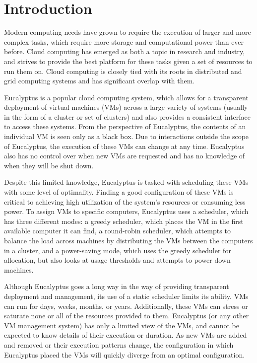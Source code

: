 \section{Introduction}
\label{sec:intro}

   Modern computing needs have grown to require the execution of larger and more complex tasks, which require more storage and computational power than ever before.  Cloud computing has emerged as both a topic in research and industry, and strives to provide the best platform for these tasks given a set of resources to run them on.  Cloud computing is closely tied with its roots in distributed and grid computing systems and has significant overlap with them.  

  Eucalyptus is a popular cloud computing system, which allows for a transparent deployment of virtual machines (VMs) across a large variety of systems (usually in the form of a cluster or set of clusters) and also provides a consistent interface to access these systems.  From the perspective of Eucalyptus, the contents of an individual VM is seen only as a black box.  Due to interactions outside the scope of Eucalyptus, the execution of these VMs can change at any time.  Eucalyptus also has no control over when new VMs are requested and has no knowledge of when they will be shut down.

Despite this limited knowledge, Eucalyptus is tasked with scheduling these VMs with some level of optimality.  Finding a good configuration of these VMs is critical to achieving high utilization of the system's resources or consuming less power.  To assign VMs to specific computers, Eucalyptus uses a scheduler, which has three different modes: a greedy scheduler, which places the VM in the first available computer it can find, a round-robin scheduler, which attempts to balance the load across machines by distributing the VMs between the computers in a cluster, and a power-saving mode, which uses the greedy scheduler for allocation, but also looks at usage thresholds and attempts to power down machines.

  Although Eucalyptus goes a long way in the way of providing transparent deployment and management, its use of a static scheduler limits its ability.  VMs can run for days, weeks, months, or years.  Additionally, these VMs can stress or saturate none or all of the resources provided to them.  Eucalyptus (or any other VM management system) has only a limited view of the VMs, and cannot be expected to know details of their execution or duration.  As new VMs are added and removed or their execution patterns change, the configuration in which Eucalyptus placed the VMs will quickly diverge from an optimal configuration.

